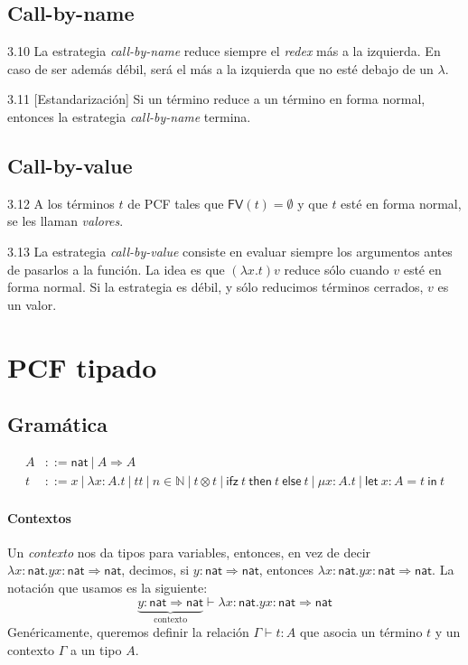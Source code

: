 \documentclass[twoside,a4paper,12pt]{article}
\theoremstyle{definition}
\theoremstyle{remark}
\newcommand\fix[2]{\ensuremath{\mathsf{\mu}#1.#2}}
\newcommand\fun[2]{\ensuremath{\lambda {#1}{.}{#2}}}
\newcommand\FV{\ensuremath{\mathsf{FV}}}
\newcommand\ifz[3]{\ensuremath{\mathsf{ifz~}#1\mathsf{~then~}#2\mathsf{~else~}#3}}
\newcommand\letl[3]{\ensuremath{\mathsf{let~}#1=#2\mathsf{~in~}#3}}
\newcommand\nat{\ensuremath{\mathsf{nat}}}
\begin{document}
\subsection*{Call-by-name}

\begin{definicion}{3.10}
  La estrategia \emph{call-by-name} reduce siempre el \emph{redex} más a la
  izquierda. En caso de ser además débil, será el más a la izquierda que no esté
  debajo de un $\lambda$.
\end{definicion}

\begin{teorema}{3.11}
  [Estandarización] Si un término reduce a un término en forma normal, entonces
  la estrategia \emph{call-by-name} termina.
\end{teorema}

\subsection*{Call-by-value}

\begin{definicion}{3.12}
  A los términos $t$ de PCF tales que $\FV(t)=\emptyset$ y que $t$ esté en forma
  normal, se les llaman \emph{valores}.
\end{definicion}

\begin{definicion}{3.13}
  La estrategia \emph{call-by-value} consiste en evaluar siempre los argumentos
  antes de pasarlos a la función. La idea es que $(\fun xt)v$
  reduce sólo cuando $v$ esté en forma normal. Si la estrategia es débil, y sólo reducimos
  términos cerrados, $v$ es un valor.
\end{definicion}

\newpage
\section*{PCF tipado}

\subsection*{Gramática}

\begin{align*}
  A &::= \nat~|~A\Rightarrow A\\
  t &::= x~|~\fun{x:A}t~|~tt~|~n\in\mathbb N~|~t\otimes t~|~\ifz ttt~|~\fix{x:A}t~|~\letl{x:A}tt
\end{align*}

\paragraph{Contextos}
Un \emph{contexto} nos da tipos para variables, entonces,
en vez de decir $\fun{x:\nat}{yx}:\nat\Rightarrow\nat$, decimos, si
$y:\nat\Rightarrow\nat$, entonces $\fun{x:\nat}{yx}:\nat\Rightarrow\nat$. La
notación que usamos es la siguiente:
\[
  \underbrace{y:\nat\Rightarrow\nat}_{\textrm{contexto}}\vdash\fun{x:\nat}{yx}:\nat\Rightarrow\nat
\]
Genéricamente, queremos definir la relación $\Gamma\vdash t:A$ que asocia un
término $t$ y un contexto $\Gamma$ a un tipo $A$.
\end{document}
